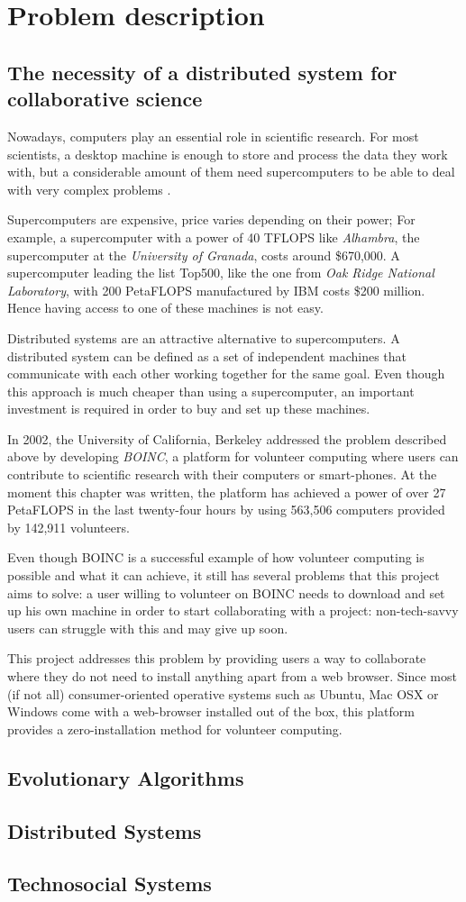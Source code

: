 \chapter{Problem description}
\section{The necessity of a distributed system for collaborative science}
Nowadays, computers play an essential role in scientific research. For most scientists, a desktop machine is enough to store and process the data they work with, but a considerable amount of them need supercomputers to be able to deal with very complex problems \cite{computing-in-science}.

Supercomputers are expensive, price varies depending on their power; For example, a supercomputer with a power of 40 TFLOPS like \textit{Alhambra}, the supercomputer at the \textit{University of Granada}, costs around \$670,000\cite{ideal-alhambra}. A supercomputer leading the list Top500,  like the one from \textit{Oak Ridge National Laboratory}, with 200 PetaFLOPS manufactured by IBM costs \$200 million\cite{oak-ridge}. Hence having access to one of these machines is not easy.

Distributed systems are an attractive alternative to supercomputers. A distributed system can be defined as a set of independent machines that communicate with each other working together for the same goal. Even though this approach is much cheaper than using a supercomputer, an important investment is required in order to buy and set up these machines.

In 2002, the University of California, Berkeley addressed the problem described above by developing \textit{BOINC}\cite{boinc-website}, a platform for volunteer computing where users can contribute to scientific research with their computers or smart-phones. At the moment this chapter was written, the platform has achieved a power of over 27 PetaFLOPS in the last twenty-four hours by using 563,506 computers provided by 142,911 volunteers.

Even though BOINC is a successful example of how volunteer computing is possible and what it can achieve, it still has several problems that this project aims to solve: a user willing to volunteer on BOINC needs to download and set up his own machine in order to start collaborating with a project: non-tech-savvy users can struggle with this and may give up soon.

This project addresses this problem by providing users a way to collaborate where they do not need to install anything apart from a web browser. Since most (if not all) consumer-oriented operative systems such as Ubuntu, Mac OSX or Windows come with a web-browser installed out of the box, this platform provides a zero-installation method for volunteer computing.

\section{Evolutionary Algorithms}

\section{Distributed Systems}

\section{Technosocial Systems}

